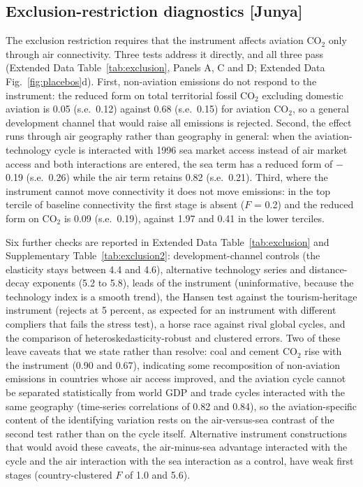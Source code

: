 \documentclass[12pt]{extarticle}
\begin{document}
\subsection*{Exclusion-restriction diagnostics [Junya]}
The exclusion restriction requires that the instrument affects aviation
CO$_2$ only through air connectivity. Three tests address it directly, and
all three pass (Extended Data Table~\ref{tab:exclusion}, Panels A, C and D;
Extended Data Fig.~\ref{fig:placebos}d). First, non-aviation emissions do
not respond to the instrument: the reduced form on total territorial fossil
CO$_2$ excluding domestic aviation is 0.05 (s.e.\ 0.12) against 0.68 (s.e.\
0.15) for aviation CO$_2$, so a general development channel that would
raise all emissions is rejected. Second, the effect runs through air
geography rather than geography in general: when the aviation-technology
cycle is interacted with 1996 sea market access instead of air market
access and both interactions are entered, the sea term has a reduced form
of $-$0.19 (s.e.\ 0.26) while the air term retains 0.82 (s.e.\ 0.21). Third,
where the instrument cannot move connectivity it does not move emissions:
in the top tercile of baseline connectivity the first stage is absent
($F$ = 0.2) and the reduced form on CO$_2$ is 0.09 (s.e.\ 0.19), against
1.97 and 0.41 in the lower terciles.

Six further checks are reported in Extended Data Table~\ref{tab:exclusion}
and Supplementary Table~\ref{tab:exclusion2}: development-channel controls
(the elasticity stays between 4.4 and 4.6), alternative technology series
and distance-decay exponents (5.2 to 5.8), leads of the instrument
(uninformative, because the technology index is a smooth trend), the
Hansen test against the tourism-heritage instrument (rejects at 5 percent,
as expected for an instrument with different compliers that fails the
stress test), a horse race against rival global cycles, and the comparison
of heteroskedasticity-robust and clustered errors. Two of these leave
caveats that we state rather than resolve: coal and cement CO$_2$ rise
with the instrument (0.90 and 0.67), indicating some recomposition of
non-aviation emissions in countries whose air access improved, and the
aviation cycle cannot be separated statistically from world GDP and trade
cycles interacted with the same geography (time-series correlations of
0.82 and 0.84), so the aviation-specific content of the identifying
variation rests on the air-versus-sea contrast of the second test rather
than on the cycle itself. Alternative instrument constructions that would
avoid these caveats, the air-minus-sea advantage interacted with the
cycle and the air interaction with the sea interaction as a control, have
weak first stages (country-clustered $F$ of 1.0 and 5.6).
\end{document}
